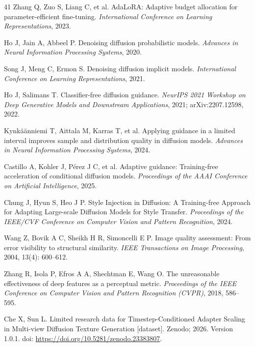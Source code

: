 \documentclass[times,twocolumn,final]{elsarticle}
\begin{document}
\begin{thebibliography}{41}
Zhang Q, Zuo S, Liang C, et al. AdaLoRA: Adaptive budget allocation for parameter-efficient fine-tuning. \textit{International Conference on Learning Representations}, 2023.

Ho J, Jain A, Abbeel P. Denoising diffusion probabilistic models. \textit{Advances in Neural Information Processing Systems}, 2020.

Song J, Meng C, Ermon S. Denoising diffusion implicit models. \textit{International Conference on Learning Representations}, 2021.

Ho J, Salimans T. Classifier-free diffusion guidance. \textit{NeurIPS 2021 Workshop on Deep Generative Models and Downstream Applications}, 2021; arXiv:2207.12598, 2022.

Kynk\"a\"anniemi T, Aittala M, Karras T, et al. Applying guidance in a limited interval improves sample and distribution quality in diffusion models. \textit{Advances in Neural Information Processing Systems}, 2024.

Castillo A, Kohler J, P\'erez J C, et al. Adaptive guidance: Training-free acceleration of conditional diffusion models. \textit{Proceedings of the AAAI Conference on Artificial Intelligence}, 2025.

Chung J, Hyun S, Heo J P. Style Injection in Diffusion: A Training-free Approach for Adapting Large-scale Diffusion Models for Style Transfer. \textit{Proceedings of the IEEE/CVF Conference on Computer Vision and Pattern Recognition}, 2024.

Wang Z, Bovik A C, Sheikh H R, Simoncelli E P. Image quality assessment: From error visibility to structural similarity. \textit{IEEE Transactions on Image Processing}, 2004, 13(4): 600--612.

Zhang R, Isola P, Efros A A, Shechtman E, Wang O. The unreasonable effectiveness of deep features as a perceptual metric. \textit{Proceedings of the IEEE Conference on Computer Vision and Pattern Recognition (CVPR)}, 2018, 586--595.

Che X, Sun L. Limited research data for Timestep-Conditioned Adapter Scaling in Multi-view Diffusion Texture Generation [dataset]. Zenodo; 2026. Version 1.0.1. doi: \url{https://doi.org/10.5281/zenodo.23383807}.

\end{thebibliography}
\endgroup
\end{document}
